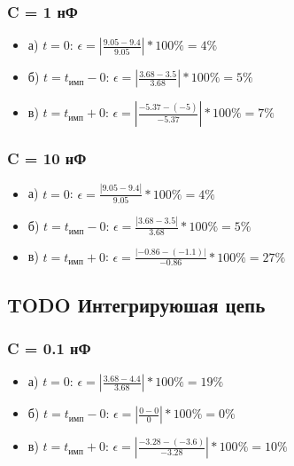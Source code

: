 \subsubsection{C = 1 нФ}
\begin{itemize}
\item[] а) $t = 0$: $\epsilon = |\frac{9.05 - 9.4}{ 9.05 }| * 100\% = 4 \%$

\item[] б) $t = t_\text{имп} - 0$: $\epsilon = |\frac{3.68 - 3.5}{ 3.68 }| * 100\% = 5 \%$

\item[] в) $t = t_\text{имп} + 0$: $\epsilon = |\frac{-5.37 - (-5)}{ -5.37 }| * 100\% = 7 \%$
\end{itemize}

\subsubsection{C = 10 нФ}
\begin{itemize}
\item[] а) $t = 0$: $\epsilon = \frac{| 9.05 - 9.4 |}{ 9.05 } * 100\% = 4 \%$

\item[] б) $t = t_\text{имп} - 0$: $\epsilon = \frac{| 3.68 - 3.5 |}{ 3.68 } * 100\% = 5 \%$

\item[] в) $t = t_\text{имп} + 0$: $\epsilon = \frac{| -0.86 - (-1.1) |}{ -0.86 } * 100\% = 27 \%$
\end{itemize}

\subsection{TODO Интегрируюшая цепь}
\subsubsection{C = 0.1 нФ}
\begin{itemize}
\item[] а) $t = 0$: $\epsilon = |\frac{3.68 - 4.4}{ 3.68 }| * 100\% = 19 \%$

\item[] б) $t = t_\text{имп} - 0$: $\epsilon = |\frac{0 - 0}{ 0 }| * 100\% = 0 \%$

\item[] в) $t = t_\text{имп} + 0$: $\epsilon = |\frac{-3.28 - (-3.6)}{ -3.28 }| * 100\% = 10 \%$ 
\end{itemize}

